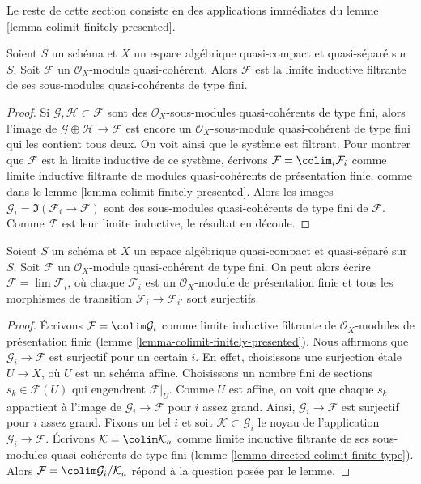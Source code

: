 \noindent
Le reste de cette section consiste en des applications immédiates
du lemme \ref{lemma-colimit-finitely-presented}.

\begin{lemma}
\label{lemma-directed-colimit-finite-type}
Soient $S$ un schéma et $X$ un espace algébrique quasi-compact et quasi-séparé
sur $S$.
Soit $\mathcal{F}$ un $\mathcal{O}_X$-module quasi-cohérent.
Alors $\mathcal{F}$ est la limite inductive filtrante de ses sous-modules quasi-cohérents
de type fini.
\end{lemma}

\begin{proof}
Si $\mathcal{G}, \mathcal{H} \subset \mathcal{F}$ sont des
$\mathcal{O}_X$-sous-modules quasi-cohérents de type fini, alors l'image
de $\mathcal{G} \oplus \mathcal{H} \to \mathcal{F}$ est encore un
$\mathcal{O}_X$-sous-module quasi-cohérent de type fini qui les contient
tous deux. On voit ainsi que le système est filtrant.
Pour montrer que $\mathcal{F}$ est la limite inductive de ce système, écrivons
$\mathcal{F} = \colim_i \mathcal{F}_i$ comme
limite inductive filtrante de modules quasi-cohérents de présentation finie, comme dans le
lemme \ref{lemma-colimit-finitely-presented}.
Alors les images $\mathcal{G}_i = \Im(\mathcal{F}_i \to \mathcal{F})$ sont des
sous-modules quasi-cohérents de type fini de $\mathcal{F}$. Comme
$\mathcal{F}$ est leur limite inductive, le résultat en découle.
\end{proof}

\begin{lemma}
\label{lemma-finite-directed-colimit-surjective-maps}
Soient $S$ un schéma et $X$ un espace algébrique quasi-compact et quasi-séparé
sur $S$. Soit $\mathcal{F}$ un $\mathcal{O}_X$-module quasi-cohérent
de type fini. On peut alors écrire
$\mathcal{F} = \lim \mathcal{F}_i$, où chaque $\mathcal{F}_i$ est un
$\mathcal{O}_X$-module de présentation finie et tous les morphismes de transition
$\mathcal{F}_i \to \mathcal{F}_{i'}$ sont surjectifs.
\end{lemma}

\begin{proof}
Écrivons $\mathcal{F} = \colim \mathcal{G}_i$ comme limite inductive filtrante de
$\mathcal{O}_X$-modules de présentation finie
(lemme \ref{lemma-colimit-finitely-presented}).
Nous affirmons que $\mathcal{G}_i \to \mathcal{F}$ est surjectif pour un certain $i$.
En effet, choisissons une surjection étale $U \to X$, où $U$ est un schéma affine.
Choisissons un nombre fini de sections $s_k \in \mathcal{F}(U)$ qui engendrent
$\mathcal{F}|_U$. Comme $U$ est affine, on voit que chaque $s_k$ appartient à l'image
de $\mathcal{G}_i \to \mathcal{F}$ pour $i$ assez grand. Ainsi,
$\mathcal{G}_i \to \mathcal{F}$ est surjectif pour $i$ assez grand.
Fixons un tel $i$ et soit $\mathcal{K} \subset \mathcal{G}_i$ le
noyau de l'application $\mathcal{G}_i \to \mathcal{F}$. Écrivons
$\mathcal{K} = \colim \mathcal{K}_a$
comme limite inductive filtrante de ses sous-modules quasi-cohérents de type fini
(lemme \ref{lemma-directed-colimit-finite-type}). Alors
$\mathcal{F} = \colim \mathcal{G}_i/\mathcal{K}_a$ répond à la question
posée par le lemme.
\end{proof}

